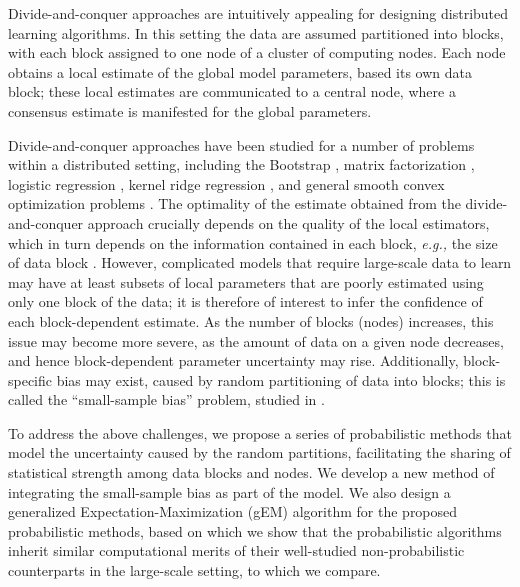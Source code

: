 \documentclass{article}
\newcommand{\eg}[0]{\emph{e.g., }}
\newcommand{\1}[0]{\ensuremath{\boldsymbol{1}}\xspace}
\begin{document}
Divide-and-conquer approaches are intuitively appealing for designing distributed learning algorithms. In this setting the data are assumed partitioned into blocks, with each block assigned to one node of a cluster of computing nodes. Each node obtains a local estimate of the global model parameters, based its own data block; these local estimates are communicated to a central node, where a consensus estimate is manifested for the global parameters. 

Divide-and-conquer approaches have been studied for a number of problems within a distributed setting, including the Bootstrap \cite{Kleiner2012}, matrix factorization \cite{Mackey2011}, logistic regression \cite{Mann2009}, kernel ridge regression \cite{YZhang2013}, and general smooth convex optimization problems \cite{YZhang2012}. The optimality of the estimate obtained from the divide-and-conquer approach crucially depends on the quality of the local estimators, which in turn depends on the information contained in each block, \eg the size of data block \cite{YZhang2012, YZhang2013}. However, complicated models that require large-scale data to learn may have at least subsets of local parameters that are poorly estimated using only one block of the data; it is therefore of interest to infer the confidence of each block-dependent estimate. As the number of blocks (nodes) increases, this issue may become more severe, as the amount of data on a given node decreases, and hence block-dependent parameter uncertainty may rise. Additionally, block-specific bias may exist, caused by random partitioning of data into blocks; this is called the ``small-sample bias'' problem, studied in \cite{YZhang2012, Scott2013}. 

To address the above challenges, we propose a series of probabilistic methods that model the uncertainty caused by the random partitions, facilitating the sharing of statistical strength among data blocks and nodes. We develop a new method of integrating the small-sample bias as part of the model. We also design a generalized Expectation-Maximization (gEM) algorithm for the proposed probabilistic methods, based on which we show that the probabilistic algorithms inherit similar computational merits of their well-studied non-probabilistic counterparts in the large-scale setting, to which we compare.
\end{document}
